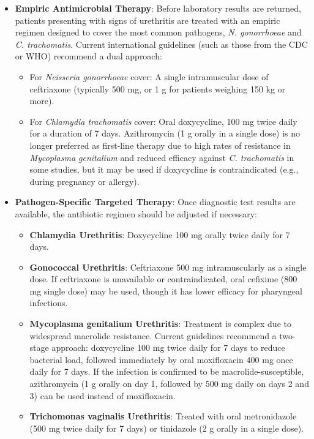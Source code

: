 \begin{itemize}
    \item \textbf{Empiric Antimicrobial Therapy}: Before laboratory results are returned, patients presenting with signs of urethritis are treated with an empiric regimen designed to cover the most common pathogens, \textit{N. gonorrhoeae} and \textit{C. trachomatis}. Current international guidelines (such as those from the CDC or WHO) recommend a dual approach:
    \begin{itemize}
        \item For \textit{Neisseria gonorrhoeae} cover: A single intramuscular dose of ceftriaxone (typically 500 mg, or 1 g for patients weighing 150 kg or more).
        \item For \textit{Chlamydia trachomatis} cover: Oral doxycycline, 100 mg twice daily for a duration of 7 days. Azithromycin (1 g orally in a single dose) is no longer preferred as first-line therapy due to high rates of resistance in \textit{Mycoplasma genitalium} and reduced efficacy against \textit{C. trachomatis} in some studies, but it may be used if doxycycline is contraindicated (e.g., during pregnancy or allergy).
    \end{itemize}

    \item \textbf{Pathogen-Specific Targeted Therapy}: Once diagnostic test results are available, the antibiotic regimen should be adjusted if necessary:
    \begin{itemize}
        \item \textbf{Chlamydia Urethritis}: Doxycycline 100 mg orally twice daily for 7 days.
        \item \textbf{Gonococcal Urethritis}: Ceftriaxone 500 mg intramuscularly as a single dose. If ceftriaxone is unavailable or contraindicated, oral cefixime (800 mg single dose) may be used, though it has lower efficacy for pharyngeal infections.
        \item \textbf{Mycoplasma genitalium Urethritis}: Treatment is complex due to widespread macrolide resistance. Current guidelines recommend a two-stage approach: doxycycline 100 mg twice daily for 7 days to reduce bacterial load, followed immediately by oral moxifloxacin 400 mg once daily for 7 days. If the infection is confirmed to be macrolide-susceptible, azithromycin (1 g orally on day 1, followed by 500 mg daily on days 2 and 3) can be used instead of moxifloxacin.
        \item \textbf{Trichomonas vaginalis Urethritis}: Treated with oral metronidazole (500 mg twice daily for 7 days) or tinidazole (2 g orally in a single dose).
    \end{itemize}


\end{itemize}
